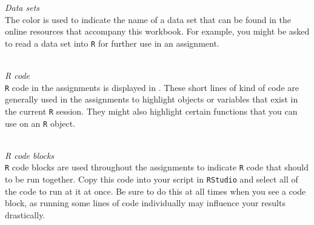 \bigskip

\textit{Data sets} \\

The color  is used to indicate the name of a data set that can be found in the online resources that accompany this workbook. For example, you might be asked to read a data set into \texttt{R} for further use in an assignment. \\

 \\

\bigskip 

\textit{R code} \\ 

\texttt{R} code in the assignments is displayed in . These short lines of kind of code are generally used in the assignments to highlight objects or variables that exist in the current \texttt{R} session. They might also highlight certain functions that you can use on an \texttt{R} object. \\

 \\ 

\bigskip

\textit{R code blocks} \\ 

\texttt{R} code blocks are used throughout the assignments to indicate \texttt{R} code that should to be run together. Copy this code into your script in \texttt{RStudio} and select all of the code to run at it at once. Be sure to do this at all times when you see a code block, as running some lines of code individually may influence your results drastically. \\

